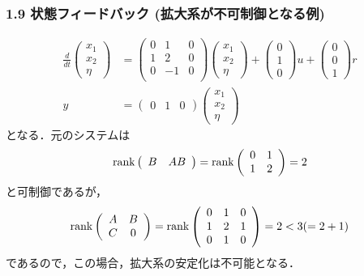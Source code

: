 \begin{frame}[t]
\frametitle{1.9 状態フィードバック (拡大系が不可制御となる例)}
\vspace*{-5mm}

\begin{align}
 \frac{d}{dt}
 \left(
 \begin{array}{c}
  x_1 \\
  x_2 \\
  \eta
 \end{array}
 \right) &=
 \left(
 \begin{array}{ccc}
  0 & 1 & 0 \\
  1 & 2 & 0 \\
  0 & -1 & 0 \\
 \end{array}
 \right)
 \left(
 \begin{array}{c}
  x_1 \\
  x_2 \\
  \eta
 \end{array}
 \right) +
 \left(
 \begin{array}{c}
  0 \\
  1 \\
  0
 \end{array}
 \right) u +
 \left(
 \begin{array}{c}
  0 \\
  0 \\
  1
 \end{array}
 \right) r \\
 y &=
 \left(
 \begin{array}{ccc}
  0 & 1 & 0
 \end{array}
 \right)
 \left(
 \begin{array}{c}
  x_1 \\
  x_2 \\
  \eta
 \end{array}
 \right)
\end{align}
となる．元のシステムは
\begin{gather}
 \mathop{\rm rank}\nolimits
 \left(
 \begin{array}{cc}
  B & AB
 \end{array}
 \right) =
 \mathop{\rm rank}\nolimits
 \left(
 \begin{array}{cc}
  0 & 1 \\
  1 & 2
 \end{array}
 \right) = 2 \\
\end{gather}
と可制御であるが，
\begin{gather}
 \mathop{\rm rank}\nolimits
 \left(
 \begin{array}{cc}
  A & B \\
  C & 0
 \end{array}
 \right) =
 \mathop{\rm rank}\nolimits
 \left(
 \begin{array}{ccc}
  0 & 1 & 0 \\
  1 & 2 & 1 \\
  0 & 1 & 0
 \end{array}
 \right) =
 2 < 3(= 2 + 1)
\end{gather}
であるので，この場合，拡大系の安定化は不可能となる．
\end{frame}


